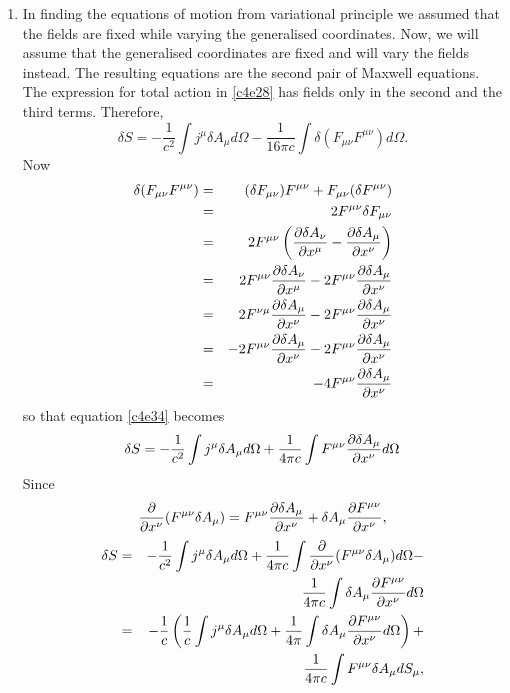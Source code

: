 \begin{enumerate}
\item In finding the equations of motion from variational principle we assumed
that the fields are fixed while varying the generalised coordinates. Now, we will
assume that the generalised coordinates are fixed and will vary the fields instead.
The resulting equations are the second pair of Maxwell equations. The expression
for total action in \eqref{c4e28} has fields only in the second and the third
terms. Therefore,
\begin{equation}\label{c4e34}
\delta S = -\frac{1}{c^2}\int j^\mu \delta A_\mu d\Omega - \frac{1}{16\pi c}
\int\delta(F_{\mu\nu}F^{\mu\nu})d\Omega.
\end{equation}
Now 
\begin{eqnarray*}
\delta(F_{\mu\nu}F^{\mu\nu}) &=& (\delta F_{\mu\nu})F^{\mu\nu} + F_{\mu\nu} (\delta F^{\mu\nu}) \\
 &=& 2F^{\mu\nu}\delta F_{\mu\nu} \\
 &=& 2F^{\mu\nu}\left(\frac{\partial{\delta A_\nu}}{\partial{x^\mu}} - \frac{\partial{\delta A_\mu}}{\partial{x^\nu}}\right) \\
 &=& 2F^{\mu\nu}\frac{\partial{\delta A_\nu}}{\partial{x^\mu}} - 2F^{\mu\nu}\frac{\partial{\delta A_\mu}}{\partial{x^\nu}} \\
 &=& 2F^{\nu\mu}\frac{\partial{\delta A_\mu}}{\partial{x^\nu}} - 2F^{\mu\nu}\frac{\partial{\delta A_\mu}}{\partial{x^\nu}} \\
 &=& -2F^{\mu\nu}\frac{\partial{\delta A_\mu}}{\partial{x^\nu}} - 2F^{\mu\nu}\frac{\partial{\delta A_\mu}}{\partial{x^\nu}} \\
 &=& -4F^{\mu\nu}\frac{\partial{\delta A_\mu}}{\partial{x^\nu}}
\end{eqnarray*}
so that equation \eqref{c4e34} becomes
\begin{equation}\label{c4e35}
\delta S = -\frac{1}{c^2}\int j^\mu \delta A_\mu d\Omega + \frac{1}{4\pi c}
\int F^{\mu\nu}\frac{\partial{\delta A_\mu}}{\partial{x^\nu}} d\Omega
\end{equation}
Since 
\[
\frac{\partial}{\partial x^\nu}(F^{\mu\nu} \delta A_\mu) =
F^{\mu\nu}\frac{\partial{\delta A_\mu}}{\partial{x^\nu}} + \delta A_\mu\frac{\partial{F^{\mu\nu}}}{\partial{x^\nu}},
\]
\begin{eqnarray}
\delta S &=& -\frac{1}{c^2}\int j^\mu \delta A_\mu d\Omega + 
\frac{1}{4\pi c}\int \frac{\partial}{\partial x^\nu}(F^{\mu\nu} \delta A_\mu) d\Omega - \nonumber \\
 & & \frac{1}{4\pi c}\int \delta A_\mu\pdt{F^{\mu\nu}}{x^\nu} d\Omega \nonumber \\
 &=& -\frac{1}{c}\left(\frac{1}{c}\int j^\mu \delta A_\mu d\Omega + 
    \frac{1}{4\pi} \int\delta A_\mu\pdt{F^{\mu\nu}}{x^\nu}d\Omega\right) + \nonumber \\
 & & \frac{1}{4\pi c}\int F^{\mu\nu}\delta A_\mu dS_\mu, \nonumber 

\end{eqnarray}
\end{enumerate}
